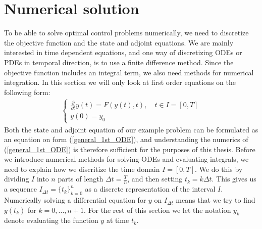 \section{Numerical solution}
To be able to solve optimal control problems numerically, we need to discretize the objective function and the state and adjoint equations. We are mainly interested in time dependent equations, and one way of discretizing ODEs or PDEs in temporal direction, is to use a finite difference method. Since the objective function includes an integral term, we also need methods for numerical integration. In this section we will only look at first order equations on the following form:
\begin{align}
\left\{
     \begin{array}{lr}
	\frac{\partial}{\partial t} y(t) = F(y(t),t),\quad t\in I=[0,T] \\
	y(0)=y_0 
	\end{array}
\right.\label{general_1st_ODE}
\end{align}
Both the state and adjoint equation of our example problem can be formulated as an equation on form (\ref{general_1st_ODE}), and understanding the numerics of (\ref{general_1st_ODE}) is therefore sufficient for the purposes of this thesis. Before we introduce numerical methods for solving ODEs and evaluating integrals, we need to explain how we discritize the time domain $I=[0,T]$. We do this by dividing $I$ into $n$ parts of length $\Delta t=\frac{T}{n}$, and then setting $t_k=k\Delta t$. This gives us a sequence $I_{\Delta t}=\{t_k\}_{k=0}^{n}$ as a discrete representation of the interval $I$. Numerically solving a differential equation for $y$ on $I_{\Delta t}$ means that we try to find $y(t_k)$ for $k=0,...,n+1$. For the rest of this section we let the notation $y_k$ denote evaluating the function $y$ at time $t_k$.
